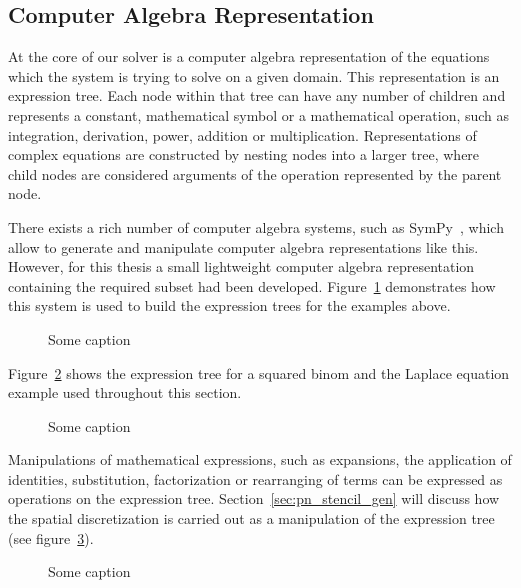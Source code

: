 \subsection{Computer Algebra Representation}
\label{sec:pn_car}

At the core of our solver is a computer algebra representation of the equations which the system is trying to solve on a given domain. This representation is an expression tree. Each node within that tree can have any number of children and represents a constant, mathematical symbol or a mathematical operation, such as integration, derivation, power, addition or multiplication. Representations of complex equations are constructed by nesting nodes into a larger tree, where child nodes are considered arguments of the operation represented by the parent node.

There exists a rich number of computer algebra systems, such as SymPy~\cite{Meurer17}, which allow to generate and manipulate computer algebra representations like this. However, for this thesis a small lightweight computer algebra representation containing the required subset had been developed. Figure~\ref{fig:pn_math_expression_tree_generation} demonstrates how this system is used to build the expression trees for the examples above.
\begin{figure}[h]
\centering
{}
\caption{Some caption}
\label{fig:pn_math_expression_tree_generation}
\end{figure}

Figure~\ref{fig:pn_math_expression_tree} shows the expression tree for a squared binom and the Laplace equation example used throughout this section.
\begin{figure}[h]
\centering
{}
\caption{Some caption}
\label{fig:pn_math_expression_tree}
\end{figure}

Manipulations of mathematical expressions, such as expansions, the application of identities, substitution, factorization or rearranging of terms can be expressed as operations on the expression tree. Section~\ref{sec:pn_stencil_gen} will discuss how the spatial discretization is carried out as a manipulation of the expression tree (see figure~\ref{fig:pn_math_expression_tree_manipulation}).
\begin{figure}[h]
\centering
{}
\caption{Some caption}
\label{fig:pn_math_expression_tree_manipulation}
\end{figure}

